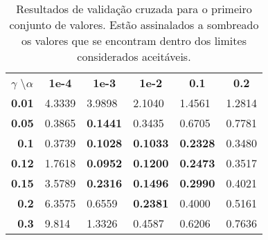 \begin{table}[ht]
\footnotesize
\centering
\begin{tabular}{|rlllll|}
\hline
\multicolumn{1}{|l}{$\gamma$ \textbackslash $\alpha$} & \multicolumn{1}{c}{\textbf{1e-4}} & \multicolumn{1}{c}{\textbf{1e-3}} & \multicolumn{1}{c}{\textbf{1e-2}} & \multicolumn{1}{c}{\textbf{0.1}} & \multicolumn{1}{c|}{\textbf{0.2}} \\ \cline{2-6} 
\multicolumn{1}{|r|}{\textbf{0.01}} & 4.3339 & 3.9898 & 2.1040 & 1.4561 & 1.2814 \\
\multicolumn{1}{|r|}{\textbf{0.05}} & 0.3865 & \cellcolor[HTML]{EFEFEF}\textbf{0.1441} & 0.3435 & 0.6705 & 0.7781 \\
\multicolumn{1}{|r|}{\textbf{0.1}} & 0.3739 & \cellcolor[HTML]{EFEFEF}\textbf{0.1028} & \cellcolor[HTML]{EFEFEF}\textbf{0.1033} & \cellcolor[HTML]{EFEFEF}\textbf{0.2328} & 0.3480 \\
\multicolumn{1}{|r|}{\textbf{0.12}} & 1.7618 & \cellcolor[HTML]{EFEFEF}\textbf{0.0952} & \cellcolor[HTML]{EFEFEF}\textbf{0.1200} & \cellcolor[HTML]{EFEFEF}\textbf{0.2473} & 0.3517 \\
\multicolumn{1}{|r|}{\textbf{0.15}} & 3.5789 & \cellcolor[HTML]{EFEFEF}\textbf{0.2316} & \cellcolor[HTML]{EFEFEF}\textbf{0.1496} & \cellcolor[HTML]{EFEFEF}\textbf{0.2990} & 0.4021 \\
\multicolumn{1}{|r|}{\textbf{0.2}} & 6.3575 & 0.6559 & \cellcolor[HTML]{EFEFEF}\textbf{0.2381} & 0.4000 & 0.5161 \\
\multicolumn{1}{|r|}{\textbf{0.3}} & 9.814 & 1.3326 & 0.4587 & 0.6206 & 0.7636 \\ \hline
\end{tabular}
\caption{\footnotesize Resultados de validação cruzada para o primeiro conjunto de valores. Estão assinalados a sombreado os valores que se encontram dentro dos limites considerados aceitáveis.}
\end{table}